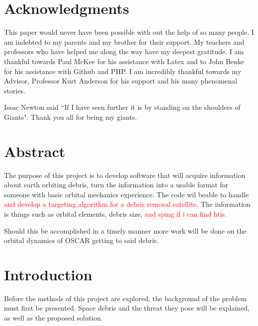 \documentclass[12pt]{article}
\begin{document}
	\newpage
		\doublespacing
	\section{Acknowledgments}
	

	This paper would never have been possible with out the help of so many people. I am indebted to my parents and my brother for their support. My teachers and professors who have helped me along the way have my deepest gratitude. I am thankful towards Paul McKee for his assistance with Latex and to John Benke for his assistance with Github and PHP. I am incredibly thankful towards my Advisor, Professor Kurt Anderson for his support and his many phenomenal stories. \par 
	
	Issac Newton said ``If I have seen further it is by standing on the shoulders of Giants"\cite{newtLettr}. Thank you all for being my giants.
	
	
	
	

	
	
	\newpage
	\section{Abstract}
	The purpose of this project is to develop software that will acquire information about earth orbiting debris, turn the information into a usable format for someone with basic orbital mechanics experience.  The code wil beable to handle \textcolor{red}{and develop a targeting algorithm for a debris removal satellite}. The information is things such as orbital elements, debris size, \textcolor{red}{ and sping if i can find htis.} \par 
	 Should this be accomplished in a timely manner more work will be done on the orbital dynamics of OSCAR getting to said debris.
	\newpage
	\section{Introduction}
	Before the methods of this project are explored, the background of the problem must first be presented. Space debris and the threat they pose will be explained, as well as the proposed solution. 
	
\end{document}
